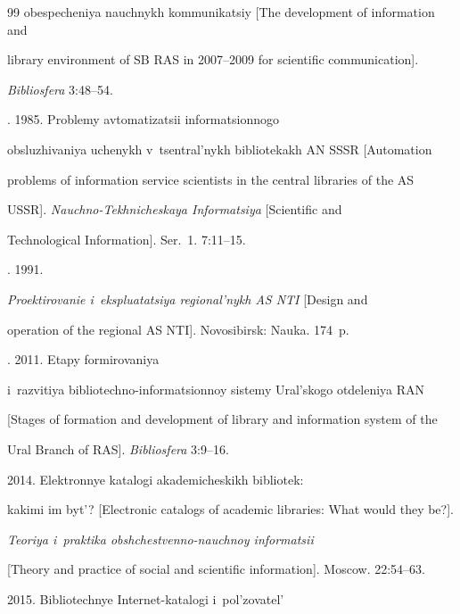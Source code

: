 {{\begin{thebibliography}{99}
obespecheniya nauchnykh kommunikatsiy [The development of information and 


library environment of SB RAS in 2007--2009 for scientific communication]. 


\textit{Bibliosfera} 3:48--54.




. 1985. Problemy avtomatizatsii informatsionnogo 


obsluzhivaniya uchenykh v~tsentral'nykh bibliotekakh AN SSSR [Automation 


problems of information service scientists in the central libraries of the AS 


USSR]. \textit{Nauchno-Tekhnicheskaya Informatsiya} [Scientific and 


Technological Information]. Ser.~1. 7:11--15. 




. 1991. 


\textit{Proektirovanie i~ekspluatatsiya regional'nykh AS NTI} [Design and 


operation of the regional AS NTI]. Novosibirsk: Nauka. 174~p.




. 2011. Etapy formirovaniya 


i~razvitiya bibliotechno-informatsionnoy sistemy Ural'skogo otdeleniya RAN 


[Stages of formation and development of library and information system of the 


Ural Branch of RAS]. \textit{Bibliosfera} 3:9--16.




 2014. Elektronnye katalogi akademicheskikh bibliotek: 


kakimi im byt'? [Electronic catalogs of academic libraries: What would they be?]. 


\textit{Teoriya i~praktika obshchestvenno-nauchnoy informatsii} 


[Theory and practice of social and scientific information]. Moscow. 22:54--63.




 2015. Bibliotechnye Internet-katalogi i~pol'zovatel' 



\end{thebibliography}}}
